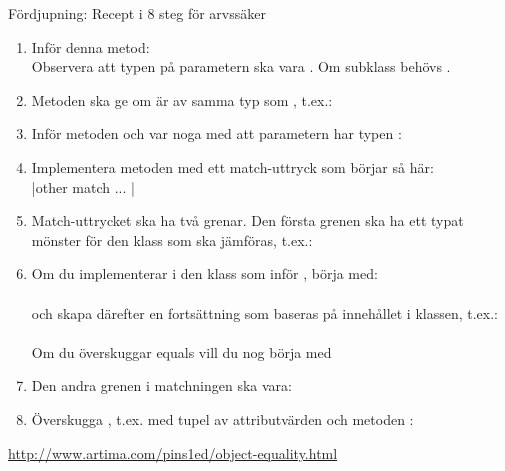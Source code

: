 \begin{Slide}{Fördjupning: Recept i 8 steg för arvssäker }\SlideFontTiny
\SlideOnly{\setlength{\leftmargini}{0pt}}
\begin{enumerate}\SlideFontTiny
\item Inför denna metod: \\Observera att typen på parametern ska vara . Om subklass behövs .

\item Metoden  ska ge  om  är av samma typ som , t.ex.: \\

\item Inför metoden  och var noga med att parametern har typen : \\ 

\item Implementera metoden  med ett match-uttryck som börjar så här: \\
\code|other match { ... } |

\item Match-uttrycket ska ha två grenar. Den första grenen ska ha ett typat mönster för den klass som ska jämföras, t.ex.: \\ 

\item Om du implementerar  i den klass som inför , börja med: \\  \\
och skapa därefter en fortsättning som baseras på innehållet i klassen, t.ex.: \\  \\
Om du överskuggar equals vill du nog börja med

\item Den andra grenen i matchningen ska vara:

\item Överskugga , t.ex. med tupel av attributvärden och metoden \code{##}: \\

\end{enumerate}
\url{http://www.artima.com/pins1ed/object-equality.html}

\end{Slide}
